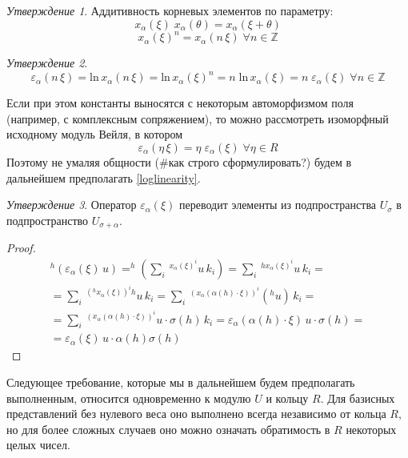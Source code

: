 \documentclass[10pt]{article}
\theoremstyle{break}
\theoremstyle{remark}
\newtheorem{prop}{Утверждение}
\newcommand{\Z}{\mathbb{Z}}
\begin{document}
\begin{prop} Аддитивность корневых элементов по параметру:
$$x_\alpha(\xi) \; x_\alpha(\theta)  = x_\alpha(\xi+\theta)$$
$$x_\alpha(\xi)^n = x_\alpha(n \, \xi) \; \forall n \in \Z$$
\end{prop}

\begin{prop}
$$ \varepsilon_\alpha(n \, \xi) = \mathrm{ln} \, x_\alpha(n \, \xi) = \mathrm{ln} \, x_\alpha(\xi)^n = n \; \mathrm{ln} \, x_\alpha(\xi) = n \; \varepsilon_\alpha(\xi) \; \forall n \in \Z
$$
\end{prop}

Если при этом константы выносятся с некоторым автоморфизмом поля (например, с комплексным сопряжением), то можно рассмотреть изоморфный исходному модуль Вейля, в котором
\begin{equation} \label{loglinearity}
\varepsilon_\alpha(\eta \, \xi) = \eta \; \varepsilon_\alpha(\xi) \; \forall \eta \in R
\end{equation}
Поэтому не умаляя общности (\#как строго сформулировать?) будем в дальнейшем предполагать \ref{loglinearity}.

\begin{prop}
Оператор $\varepsilon_\alpha(\xi)$ переводит элементы из подпространства $U_\sigma$ в подпространство $U_{\sigma+\alpha}$.
\end{prop}
\begin{proof}
\begin{multline*}
^h(\varepsilon_\alpha(\xi) \, u) =
^h\left(\sum_i \, {^{x_\alpha(\xi)^i}u \, k_i}\right) = 
\sum_i \, {^{h x_\alpha(\xi)^i}u \, k_i} = \\ =
\sum_i \, {^{(^h x_\alpha(\xi))^i h}u \, k_i} = 
\sum_i \, {^{(x_\alpha(\alpha(h)\cdot\xi))^i} \left(^h u\right) \, k_i} =\\=
\sum_i \, {^{(x_\alpha(\alpha(h)\cdot\xi))^i} u \cdot \sigma(h) \, k_i} =
\varepsilon_\alpha(\alpha(h)\cdot\xi) \, u \cdot \sigma(h) = \\ =
\varepsilon_\alpha(\xi) \, u \cdot \alpha(h)\sigma(h)
\end{multline*}
\end{proof}

Следующее требование, которые мы в дальнейшем будем предполагать выполненным, относится одновременно к модулю $U$ и кольцу $R$. Для базисных представлений без нулевого веса оно выполнено всегда независимо от кольца $R$, но для более сложных случаев оно можно означать обратимость в $R$ некоторых целых чисел.
\end{document}

